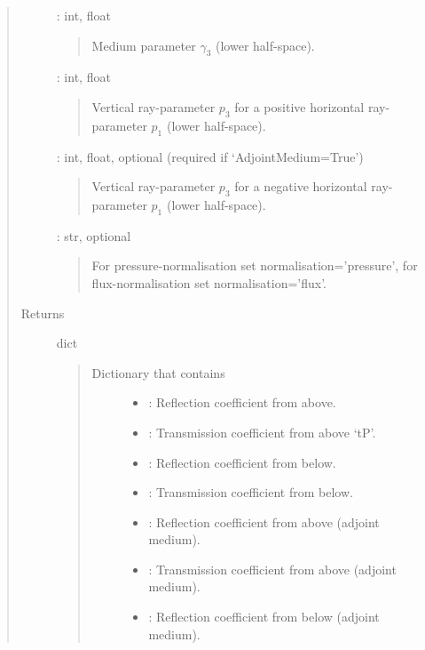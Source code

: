 \documentclass[letterpaper,10pt,english]{sphinxmanual}
\begin{document}
\begin{fulllineitems}
\begin{fulllineitems}
\begin{quote}
\begin{description}
 : int, float
\begin{quote}

Medium parameter \(\gamma_3\) (lower half-space).
\end{quote}

 : int, float
\begin{quote}

Vertical ray-parameter \(p_3\) for a positive horizontal ray-parameter \(p_1\) (lower half-space).
\end{quote}

 : int, float, optional (required if ‘AdjointMedium=True’)
\begin{quote}

Vertical ray-parameter \(p_3\) for a negative horizontal ray-parameter \(p_1\) (lower half-space).
\end{quote}

 : str, optional
\begin{quote}

For pressure-normalisation set normalisation=’pressure’, for flux-normalisation set normalisation=’flux’.
\end{quote}

\item[{Returns}] \leavevmode
dict
\begin{quote}
\begin{description}
\item[{Dictionary that contains }] \leavevmode\begin{itemize}
\item {} 
: Reflection coefficient from above.

\item {} 
: Transmission coefficient from above ‘tP’.

\item {} 
: Reflection coefficient from below.

\item {} 
: Transmission coefficient from below.

\item {} 
: Reflection coefficient from above (adjoint medium).

\item {} 
: Transmission coefficient from above (adjoint medium).

\item {} 
: Reflection coefficient from below (adjoint medium).


\end{itemize}
\end{description}
\end{quote}
\end{description}
\end{quote}
\end{fulllineitems}
\end{fulllineitems}
\end{document}

